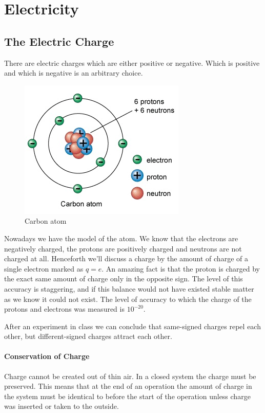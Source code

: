 \documentclass[]{book}
\begin{document}
	\part{Electricity}
	\chapter{The Electric Charge}
	There are electric charges which are either positive or negative. Which is positive and which is negative is an arbitrary choice.
	
	\begin{figure}
	\begin{center}
		\includegraphics[scale=0.5]{carb-atom}
	\end{center}
	\caption{Carbon atom}
	\end{figure}
	
	Nowadays we have the model of the atom. We know that the electrons are negatively charged, the protons are positively charged and neutrons are not charged at all. Henceforth we'll discuss a charge by the amount of charge of a single electron marked as $q=e$. An amazing fact is that the proton is charged by the exact same amount of charge only in the opposite sign. The level of this accuracy is staggering, and if this balance would not have existed stable matter as we know it could not exist. The level of accuracy to which the charge of the protons and electrons was measured is $10^{-20}$.
	
	After an experiment in class we can conclude that same-signed charges repel each other, but different-signed charges attract each other.
	
	\subsection*{Conservation of Charge}
	
	Charge cannot be created out of thin air. In a closed system the charge must be preserved. This means that at the end of an operation the amount of charge in the system must be identical to before the start of the operation unless charge was inserted or taken to the outside.
	
\end{document}
